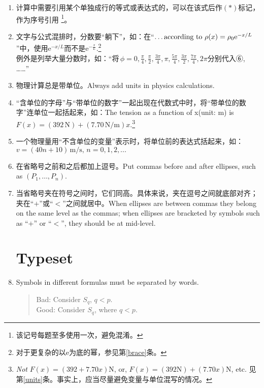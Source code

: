\documentclass[11pt, a4paper, titlepage]{article}
\newcommand{\Newton}{\mathrm{N}} %
\begin{document}
\begin{enumerate}
\begin{table}[h!]
\begin{threeparttable}
        \end{threeparttable}
    \end{table}

\item 计算中需要引用某个单独成行的等式或表达式的，可以在该式后作$(*)$标记，作为序号引用
    \footnote{该记号每题至多使用一次，避免混淆。}。

\item 文字与公式混排时，分数要“躺下”，如：在``$\text{\dots according to}\ \rho(x) = \rho_{0}\mathrm{e}^{-x/L}$''中，使用$\mathrm{e}^{-x/L}$而不是$\mathrm{e}^{-\frac{x}{L}}$.\footnote{对于更复杂的以$\mathrm{e}$为底的幂，参见第\ref{brace}条。}\\
    例外是列举大量分数时，如：“将$\, \phi = 0, \frac{\pi}{4}, \frac{\pi}{2}, \frac{3\pi}{4}, \pi, \frac{5\pi}{4}, \frac{3\pi}{2}, \frac{7\pi}{4}, 2\pi$分别代入⑥, ……”

\item\label{units}物理计算总是带单位。Always add units in physics calculations.

\item “含单位的字母”与“带单位的数字”一起出现在代数式中时，将“带单位的数字”连单位一起括起来，如：The tension as a function of x{\scriptsize(unit: m)} is $F(x) = (392\,\Newton) + (7.70\,\Newton/\mathrm{m})x$.\footnote{\emph{Not} $F(x) = (392 + 7.70x)\Newton$, or, $F(x) = (392\Newton) + (7.70x)\Newton$, etc. 见第\ref{units}条。事实上，应当尽量避免变量与单位混写的情况。}

\item 一个物理量用“不含单位的变量”表示时，将单位前的表达式括起来，如：$v = (40n + 10) \, \mathrm{m/s},\, n = 0,1,2,...$

\item 在省略号之前和之后都加上逗号。Put commas before and after ellipses, such as $(P_{1},\dots, P_{n})$.

\item 当省略号夹在符号之间时，它们同高。具体来说，夹在逗号之间就底部对齐；夹在``$+$''或``$<$''之间就居中。When ellipses are between commas they belong on the same level as the commas; when ellipses are bracketed by symbols such as ``$+$'' or ``$<$'', they should be at mid-level.




\part{Typeset}
\item Symbols in different formulas must be separated by words.
    \begin{quote}
    Bad: Consider $S_{q}$, $q < p$.\\
    Good: Consider $S_{q}$, where $q < p$.
    \end{quote}


\end{enumerate}
\end{document}
